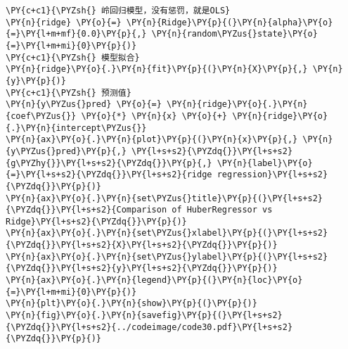 \begin{Verbatim}[commandchars=\\\{\}]
\PY{c+c1}{\PYZsh{} 岭回归模型，没有惩罚，就是OLS}
\PY{n}{ridge} \PY{o}{=} \PY{n}{Ridge}\PY{p}{(}\PY{n}{alpha}\PY{o}{=}\PY{l+m+mf}{0.0}\PY{p}{,} \PY{n}{random\PYZus{}state}\PY{o}{=}\PY{l+m+mi}{0}\PY{p}{)}
\PY{c+c1}{\PYZsh{} 模型拟合}
\PY{n}{ridge}\PY{o}{.}\PY{n}{fit}\PY{p}{(}\PY{n}{X}\PY{p}{,} \PY{n}{y}\PY{p}{)}
\PY{c+c1}{\PYZsh{} 预测值}
\PY{n}{y\PYZus{}pred} \PY{o}{=} \PY{n}{ridge}\PY{o}{.}\PY{n}{coef\PYZus{}} \PY{o}{*} \PY{n}{x} \PY{o}{+} \PY{n}{ridge}\PY{o}{.}\PY{n}{intercept\PYZus{}}
\PY{n}{ax}\PY{o}{.}\PY{n}{plot}\PY{p}{(}\PY{n}{x}\PY{p}{,} \PY{n}{y\PYZus{}pred}\PY{p}{,} \PY{l+s+s2}{\PYZdq{}}\PY{l+s+s2}{g\PYZhy{}}\PY{l+s+s2}{\PYZdq{}}\PY{p}{,} \PY{n}{label}\PY{o}{=}\PY{l+s+s2}{\PYZdq{}}\PY{l+s+s2}{ridge regression}\PY{l+s+s2}{\PYZdq{}}\PY{p}{)}
\PY{n}{ax}\PY{o}{.}\PY{n}{set\PYZus{}title}\PY{p}{(}\PY{l+s+s2}{\PYZdq{}}\PY{l+s+s2}{Comparison of HuberRegressor vs Ridge}\PY{l+s+s2}{\PYZdq{}}\PY{p}{)}
\PY{n}{ax}\PY{o}{.}\PY{n}{set\PYZus{}xlabel}\PY{p}{(}\PY{l+s+s2}{\PYZdq{}}\PY{l+s+s2}{X}\PY{l+s+s2}{\PYZdq{}}\PY{p}{)}
\PY{n}{ax}\PY{o}{.}\PY{n}{set\PYZus{}ylabel}\PY{p}{(}\PY{l+s+s2}{\PYZdq{}}\PY{l+s+s2}{y}\PY{l+s+s2}{\PYZdq{}}\PY{p}{)}
\PY{n}{ax}\PY{o}{.}\PY{n}{legend}\PY{p}{(}\PY{n}{loc}\PY{o}{=}\PY{l+m+mi}{0}\PY{p}{)}
\PY{n}{plt}\PY{o}{.}\PY{n}{show}\PY{p}{(}\PY{p}{)}
\PY{n}{fig}\PY{o}{.}\PY{n}{savefig}\PY{p}{(}\PY{l+s+s2}{\PYZdq{}}\PY{l+s+s2}{../codeimage/code30.pdf}\PY{l+s+s2}{\PYZdq{}}\PY{p}{)}
\end{Verbatim}
